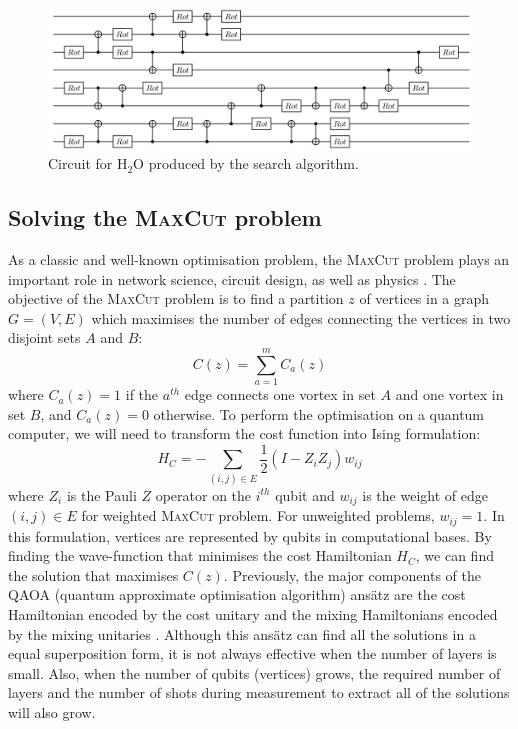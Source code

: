 \documentclass{ieeeaccess}
\begin{document}
\begin{figure}[ht!]
    \centering
   \includegraphics[width=0.9\linewidth]{peiyong_fig_15.png}
    \caption{Circuit for $\text{H}_2\text{O}$ produced by the search algorithm.}
    \label{fig:h2o_circ}
  \end{figure}

\subsection{Solving the \textsc{MaxCut} problem}
  As a classic and well-known optimisation problem, the \textsc{MaxCut} problem plays an important role in network science, circuit design, as well as physics \cite{Bharti2022-sw}. The objective of the \textsc{MaxCut} problem is to find a partition $z$ of vertices in a graph $G = (V, E)$ which maximises the number of edges connecting the vertices in two disjoint sets $A$ and $B$:
  \begin{equation}
      C(z) =\sum_{a=1}^m C_a(z)
  \end{equation}
  where $C_a(z) = 1$ if the $a^{th}$ edge connects one vortex in set $A$ and one vortex in set $B$, and $C_a(z) = 0$ otherwise. To perform the optimisation on a quantum computer, we will need to transform the cost function into Ising formulation:
  \begin{equation}
      H_C = -\sum_{(i, j)\in E} \frac{1}{2} (I - Z_i Z_j)w_{ij}
  \end{equation}\label{qaoa_ham}
  where $Z_i$ is the Pauli $Z$ operator on the $i^{th}$ qubit and $w_{ij}$ is the weight of edge $(i, j)\in E$ for weighted \textsc{MaxCut} problem. For unweighted problems, $w_{ij} = 1$. In this formulation, vertices are represented by qubits in computational bases. By finding the wave-function that minimises the cost Hamiltonian $H_C$, we can find the solution that maximises $C(z)$. Previously, the major components of the QAOA (quantum approximate optimisation algorithm) ans\"atz are the cost Hamiltonian encoded by the cost unitary and the mixing Hamiltonians encoded by the mixing unitaries \cite{Farhi2014-ug}. Although this ans\"atz can find all the solutions in a equal superposition form, it is not always effective when the number of layers is small. Also, when the number of qubits (vertices) grows, the required number of layers and the number of shots during measurement to extract all of the solutions will also grow.
  
\end{document}

